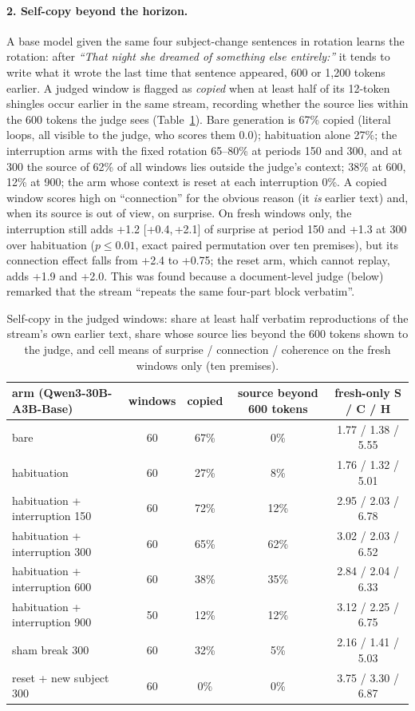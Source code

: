\documentclass{article}
\newcommand{\ci}[2]{[#1,\,#2]}
\begin{document}
\paragraph{2. Self-copy beyond the horizon.} A base model given the same four
subject-change sentences in rotation learns the rotation: after \emph{``That
night she dreamed of something else entirely:''} it tends to write what it
wrote the last time that sentence appeared, 600 or 1{,}200 tokens earlier. A
judged window is flagged as \emph{copied} when at least half of its 12-token
shingles occur earlier in the same stream, recording whether the source lies
within the 600 tokens the judge sees (Table~\ref{tab:copy}). Bare generation
is 67\% copied (literal loops, all visible to the judge, who scores them
0.0); habituation alone 27\%; the interruption arms with the fixed rotation
65--80\% at periods 150 and 300, and at 300 the source of 62\% of all windows
lies outside the judge's context; 38\% at 600, 12\% at 900; the arm whose
context is reset at each interruption 0\%. A copied window scores high on
``connection'' for the obvious reason (it \emph{is} earlier text) and, when
its source is out of view, on surprise. On fresh windows only, the
interruption still adds +1.2 \ci{+0.4}{+2.1} of surprise at period 150 and
+1.3 at 300 over habituation ($p\le0.01$, exact paired permutation over ten
premises), but its connection effect falls from +2.4 to +0.75; the reset arm,
which cannot replay, adds +1.9 and +2.0. This was found because a
document-level judge (below) remarked that the stream ``repeats the same
four-part block verbatim''.

\begin{table}[t]
\centering\small
\begin{tabular}{@{}lcccc@{}}
\toprule
arm (Qwen3-30B-A3B-Base) & windows & copied & source beyond 600 tokens & fresh-only S / C / H \\
\midrule
bare & 60 & 67\% & 0\% & 1.77 / 1.38 / 5.55 \\
habituation & 60 & 27\% & 8\% & 1.76 / 1.32 / 5.01 \\
habituation + interruption 150 & 60 & 72\% & 12\% & 2.95 / 2.03 / 6.78 \\
habituation + interruption 300 & 60 & 65\% & 62\% & 3.02 / 2.03 / 6.52 \\
habituation + interruption 600 & 60 & 38\% & 35\% & 2.84 / 2.04 / 6.33 \\
habituation + interruption 900 & 50 & 12\% & 12\% & 3.12 / 2.25 / 6.75 \\
sham break 300 & 60 & 32\% & 5\% & 2.16 / 1.41 / 5.03 \\
reset + new subject 300 & 60 & 0\% & 0\% & 3.75 / 3.30 / 6.87 \\
\bottomrule
\end{tabular}
\caption{Self-copy in the judged windows: share at least half verbatim
reproductions of the stream's own earlier text, share whose source lies
beyond the 600 tokens shown to the judge, and cell means of surprise /
connection / coherence on the fresh windows only (ten premises).}
\label{tab:copy}
\end{table}
\end{document}

